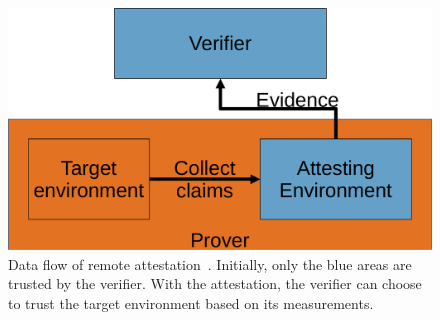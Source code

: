 \begin{figure}[htpb]
  \centering
  \includegraphics[width=0.5\linewidth]{figures/remote_attestation.pdf}
  \caption{Data flow of remote attestation~\cite{rfc9334}. Initially, only the blue areas are trusted by the verifier. With the attestation, the verifier can choose to trust the target environment based on its measurements.}\label{fig:ra}
\end{figure}
